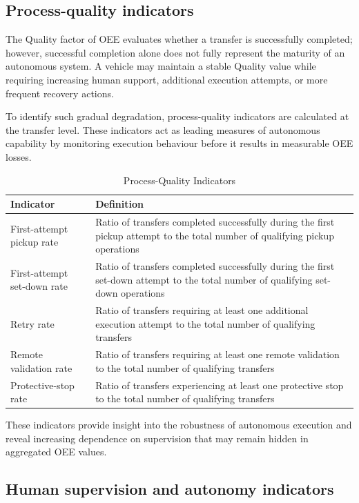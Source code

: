 \subsection{Process-quality indicators}

The Quality factor of OEE evaluates whether a transfer is successfully completed; however, successful completion alone does not fully represent the maturity of an autonomous system. A vehicle may maintain a stable Quality value while requiring increasing human support, additional execution attempts, or more frequent recovery actions.

To identify such gradual degradation, process-quality indicators are calculated at the transfer level. These indicators act as leading measures of autonomous capability by monitoring execution behaviour before it results in measurable OEE losses.

\begin{table}[H]
\small
\renewcommand{\arraystretch}{1.4}
\centering
\caption{Process-Quality Indicators}
\label{tab:process-quality-indicators}
\begin{tabular}{|p{5cm}|p{12cm}|}
\hline
\textbf{Indicator} & \textbf{Definition} \\
\hline
First-attempt pickup rate & Ratio of transfers completed successfully during the first pickup attempt to the total number of qualifying pickup operations \\
\hline
First-attempt set-down rate & Ratio of transfers completed successfully during the first set-down attempt to the total number of qualifying set-down operations \\
\hline
Retry rate & Ratio of transfers requiring at least one additional execution attempt to the total number of qualifying transfers \\
\hline
Remote validation rate & Ratio of transfers requiring at least one remote validation to the total number of qualifying transfers \\
\hline
Protective-stop rate & Ratio of transfers experiencing at least one protective stop to the total number of qualifying transfers \\
\hline
\end{tabular}
\end{table}

These indicators provide insight into the robustness of autonomous execution and reveal increasing dependence on supervision that may remain hidden in aggregated OEE values.

\subsection{Human supervision and autonomy indicators}

